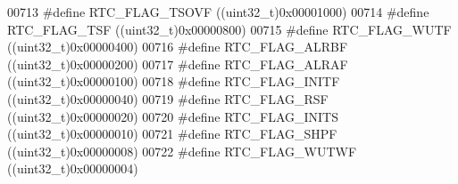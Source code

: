 \begin{DoxyCode}
00713 \textcolor{preprocessor}{#}\textcolor{preprocessor}{define} \textcolor{preprocessor}{RTC\_FLAG\_TSOVF}                    \textcolor{preprocessor}{(}\textcolor{preprocessor}{(}\textcolor{preprocessor}{uint32\_t}\textcolor{preprocessor}{)}0x00001000\textcolor{preprocessor}{)}
00714 \textcolor{preprocessor}{#}\textcolor{preprocessor}{define} \textcolor{preprocessor}{RTC\_FLAG\_TSF}                      \textcolor{preprocessor}{(}\textcolor{preprocessor}{(}\textcolor{preprocessor}{uint32\_t}\textcolor{preprocessor}{)}0x00000800\textcolor{preprocessor}{)}
00715 \textcolor{preprocessor}{#}\textcolor{preprocessor}{define} \textcolor{preprocessor}{RTC\_FLAG\_WUTF}                     \textcolor{preprocessor}{(}\textcolor{preprocessor}{(}\textcolor{preprocessor}{uint32\_t}\textcolor{preprocessor}{)}0x00000400\textcolor{preprocessor}{)}
00716 \textcolor{preprocessor}{#}\textcolor{preprocessor}{define} \textcolor{preprocessor}{RTC\_FLAG\_ALRBF}                    \textcolor{preprocessor}{(}\textcolor{preprocessor}{(}\textcolor{preprocessor}{uint32\_t}\textcolor{preprocessor}{)}0x00000200\textcolor{preprocessor}{)}
00717 \textcolor{preprocessor}{#}\textcolor{preprocessor}{define} \textcolor{preprocessor}{RTC\_FLAG\_ALRAF}                    \textcolor{preprocessor}{(}\textcolor{preprocessor}{(}\textcolor{preprocessor}{uint32\_t}\textcolor{preprocessor}{)}0x00000100\textcolor{preprocessor}{)}
00718 \textcolor{preprocessor}{#}\textcolor{preprocessor}{define} \textcolor{preprocessor}{RTC\_FLAG\_INITF}                    \textcolor{preprocessor}{(}\textcolor{preprocessor}{(}\textcolor{preprocessor}{uint32\_t}\textcolor{preprocessor}{)}0x00000040\textcolor{preprocessor}{)}
00719 \textcolor{preprocessor}{#}\textcolor{preprocessor}{define} \textcolor{preprocessor}{RTC\_FLAG\_RSF}                      \textcolor{preprocessor}{(}\textcolor{preprocessor}{(}\textcolor{preprocessor}{uint32\_t}\textcolor{preprocessor}{)}0x00000020\textcolor{preprocessor}{)}
00720 \textcolor{preprocessor}{#}\textcolor{preprocessor}{define} \textcolor{preprocessor}{RTC\_FLAG\_INITS}                    \textcolor{preprocessor}{(}\textcolor{preprocessor}{(}\textcolor{preprocessor}{uint32\_t}\textcolor{preprocessor}{)}0x00000010\textcolor{preprocessor}{)}
00721 \textcolor{preprocessor}{#}\textcolor{preprocessor}{define} \textcolor{preprocessor}{RTC\_FLAG\_SHPF}                     \textcolor{preprocessor}{(}\textcolor{preprocessor}{(}\textcolor{preprocessor}{uint32\_t}\textcolor{preprocessor}{)}0x00000008\textcolor{preprocessor}{)}
00722 \textcolor{preprocessor}{#}\textcolor{preprocessor}{define} \textcolor{preprocessor}{RTC\_FLAG\_WUTWF}                    \textcolor{preprocessor}{(}\textcolor{preprocessor}{(}\textcolor{preprocessor}{uint32\_t}\textcolor{preprocessor}{)}0x00000004\textcolor{preprocessor}{)}

\end{DoxyCode}
